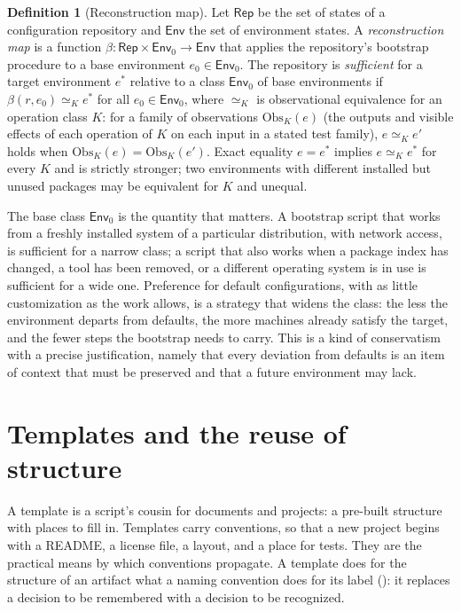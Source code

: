 \documentclass[11pt,twoside,openright]{book}
\theoremstyle{plain}
\theoremstyle{definition}
\newtheorem{definition}[theorem]{Definition}
\theoremstyle{remark}
\begin{document}
\begin{definition}[Reconstruction map]\label{def:reconstruct}
Let $\mathsf{Rep}$ be the set of states of a configuration repository and $\mathsf{Env}$ the set of environment states. A \emph{reconstruction map} is a function $\beta:\mathsf{Rep}\times\mathsf{Env}_0\to\mathsf{Env}$ that applies the repository's bootstrap procedure to a base environment $e_0\in\mathsf{Env}_0$. The repository is \emph{sufficient} for a target environment $e^*$ relative to a class $\mathsf{Env}_0$ of base environments if $\beta(r,e_0)\simeq_K e^*$ for all $e_0\in\mathsf{Env}_0$, where $\simeq_K$ is observational equivalence for an operation class $K$: for a family of observations $\mathrm{Obs}_K(e)$ (the outputs and visible effects of each operation of $K$ on each input in a stated test family), $e\simeq_K e'$ holds when $\mathrm{Obs}_K(e)=\mathrm{Obs}_K(e')$. Exact equality $e=e^*$ implies $e\simeq_K e^*$ for every $K$ and is strictly stronger; two environments with different installed but unused packages may be equivalent for $K$ and unequal.
\end{definition}

The base class $\mathsf{Env}_0$ is the quantity that matters. A bootstrap script that works from a freshly installed system of a particular distribution, with network access, is sufficient for a narrow class; a script that also works when a package index has changed, a tool has been removed, or a different operating system is in use is sufficient for a wide one. Preference for default configurations, with as little customization as the work allows, is a strategy that widens the class: the less the environment departs from defaults, the more machines already satisfy the target, and the fewer steps the bootstrap needs to carry. This is a kind of conservatism with a precise justification, namely that every deviation from defaults is an item of context that must be preserved and that a future environment may lack.

\section{Templates and the reuse of structure}

A template is a script's cousin for documents and projects: a pre-built structure with places to fill in. Templates carry conventions, so that a new project begins with a README, a license file, a layout, and a place for tests. They are the practical means by which conventions propagate. A template does for the structure of an artifact what a naming convention does for its label (): it replaces a decision to be remembered with a decision to be recognized.
\end{document}
